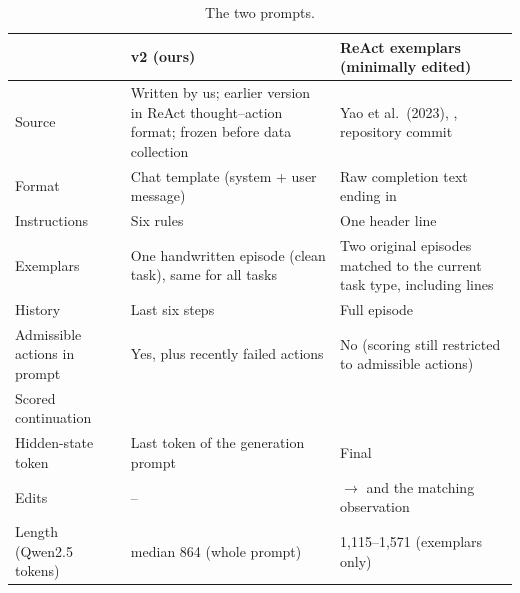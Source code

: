 \begin{table}[htbp]
\centering\small
\caption{The two prompts.}\label{tab:a4}
\begin{tabularx}{\linewidth}{@{}lLL@{}}
\toprule
 & v2 (ours) & ReAct exemplars (minimally edited) \\
\midrule
Source & Written by us; earlier version in ReAct thought--action format; frozen before data collection & Yao et al.\ (2023), , repository commit  \\
Format & Chat template (system + user message) & Raw completion text ending in \code{>} \\
Instructions & Six rules & One header line \\
Exemplars & One handwritten episode (clean task), same for all tasks & Two original episodes matched to the current task type, including  lines \\
History & Last six steps & Full episode \\
Admissible actions in prompt & Yes, plus recently failed actions & No (scoring still restricted to admissible actions) \\
Scored continuation &  &  \\
Hidden-state token & Last token of the generation prompt & Final \code{>} \\
Edits & -- &  $\rightarrow$  and the matching observation \\
Length (Qwen2.5 tokens) & median 864 (whole prompt) & 1,115--1,571 (exemplars only) \\
\bottomrule
\end{tabularx}
\end{table}
